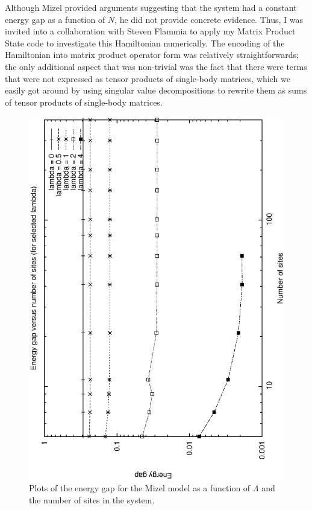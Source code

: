 \documentclass[12pt]{amsbook}
\theoremstyle{plain}
\theoremstyle{definition}
\theoremstyle{remark}
\begin{document}
Although Mizel provided arguments suggesting that the system had a constant energy gap as a function of $N$, he did not provide concrete evidence.  Thus, I was invited into a collaboration with Steven Flammia to apply my Matrix Product State code to investigate this Hamiltonian numerically.   The encoding of the Hamiltonian into matrix product operator form was relatively straightforwards;  the only additional aspect that was non-trivial was the fact that there were terms that were not expressed as tensor products of single-body matrices, which we easily got around by using singular value decompositions to rewrite them as sums of tensor products of single-body matrices.

\begin{figure}
\includegraphics[width=\columnwidth]{images/mizel}
\caption{Plots of the energy gap for the Mizel model as a function of $\Lambda$ and the number of sites in the system.}
\label{plot:mizel}
\end{figure}
\end{document}
